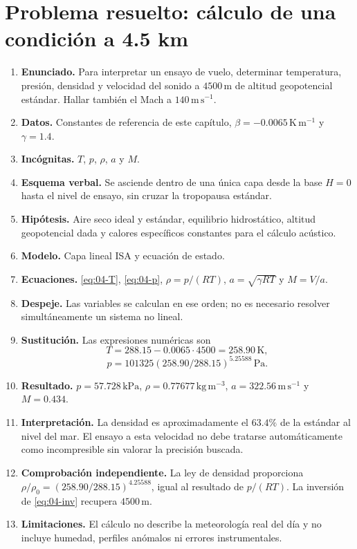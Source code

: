 \section{Problema resuelto: cálculo de una condición a 4.5 km}
\begin{enumerate}
\item \textbf{Enunciado.} Para interpretar un ensayo de vuelo, determinar temperatura, presión, densidad y velocidad del sonido a $4500\,\mathrm{m}$ de altitud geopotencial estándar. Hallar también el Mach a $140\,\mathrm{m\,s^{-1}}$.
\item \textbf{Datos.} Constantes de referencia de este capítulo, $\beta=-0.0065\,\mathrm{K\,m^{-1}}$ y $\gamma=1.4$.
\item \textbf{Incógnitas.} $T$, $p$, $\rho$, $a$ y $M$.
\item \textbf{Esquema verbal.} Se asciende dentro de una única capa desde la base $H=0$ hasta el nivel de ensayo, sin cruzar la tropopausa estándar.
\item \textbf{Hipótesis.} Aire seco ideal y estándar, equilibrio hidrostático, altitud geopotencial dada y calores específicos constantes para el cálculo acústico.
\item \textbf{Modelo.} Capa lineal ISA y ecuación de estado.
\item \textbf{Ecuaciones.} \eqref{eq:04-T}, \eqref{eq:04-p}, $\rho=p/(RT)$, $a=\sqrt{\gamma RT}$ y $M=V/a$.
\item \textbf{Despeje.} Las variables se calculan en ese orden; no es necesario resolver simultáneamente un sistema no lineal.
\item \textbf{Sustitución.} Las expresiones numéricas son
\[
 T=288.15-0.0065\cdot4500=258.90\,\mathrm{K},
\]
\[
 p=101325(258.90/288.15)^{5.25588}\,\mathrm{Pa}.
\]
\item \textbf{Resultado.} $p=57.728\,\mathrm{kPa}$, $\rho=0.77677\,\mathrm{kg\,m^{-3}}$, $a=322.56\,\mathrm{m\,s^{-1}}$ y $M=0.434$.
\item \textbf{Interpretación.} La densidad es aproximadamente el $63.4\%$ de la estándar al nivel del mar. El ensayo a esta velocidad no debe tratarse automáticamente como incompresible sin valorar la precisión buscada.
\item \textbf{Comprobación independiente.} La ley de densidad proporciona $\rho/\rho_0=(258.90/288.15)^{4.25588}$, igual al resultado de $p/(RT)$. La inversión de \eqref{eq:04-inv} recupera $4500\,\mathrm{m}$.
\item \textbf{Limitaciones.} El cálculo no describe la meteorología real del día y no incluye humedad, perfiles anómalos ni errores instrumentales.
\end{enumerate}

